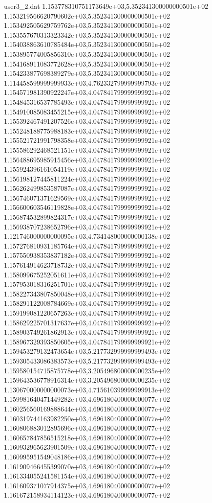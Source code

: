 \begin{filecontents}{user3_2.dat}
1.153778310751173649e+03,5.352341300000000501e+02
1.153219566620790602e+03,5.352341300000000501e+02
1.153492505629759762e+03,5.352341300000000501e+02
1.153557670313323342e+03,5.352341300000000501e+02
1.154038863610785484e+03,5.352341300000000501e+02
1.153895774005856310e+03,5.352341300000000501e+02
1.154168911083772628e+03,5.352341300000000501e+02
1.154233877698389279e+03,5.352341300000000501e+02
1.114458599999999933e+03,4.762332799999999793e+02
1.154571981390922247e+03,4.047841799999999921e+02
1.154845316537785493e+03,4.047841799999999921e+02
1.154910085083455215e+03,4.047841799999999921e+02
1.155392467491207526e+03,4.047841799999999921e+02
1.155248188775988183e+03,4.047841799999999921e+02
1.155521721991798358e+03,4.047841799999999921e+02
1.155586292468521151e+03,4.047841799999999921e+02
1.156488695985915456e+03,4.047841799999999921e+02
1.155924396161054119e+03,4.047841799999999921e+02
1.156198127445811224e+03,4.047841799999999921e+02
1.156262499853587087e+03,4.047841799999999921e+02
1.156746071371629569e+03,4.047841799999999921e+02
1.156600603546119828e+03,4.047841799999999921e+02
1.156874532899824317e+03,4.047841799999999921e+02
1.156938707238652796e+03,4.047841799999999921e+02
1.121746000000000095e+03,4.734148000000000138e+02
1.157276810931185764e+03,4.047841799999999921e+02
1.157550938353837182e+03,4.047841799999999921e+02
1.157614914623718732e+03,4.047841799999999921e+02
1.158099675252051611e+03,4.047841799999999921e+02
1.157953018316251701e+03,4.047841799999999921e+02
1.158227343807850048e+03,4.047841799999999921e+02
1.158291122008784669e+03,4.047841799999999921e+02
1.159199081220657263e+03,4.047841799999999921e+02
1.158629225701317637e+03,4.047841799999999921e+02
1.158903749261862913e+03,4.047841799999999921e+02
1.158967329393850605e+03,4.047841799999999921e+02
1.159453279132473654e+03,5.217732999999999493e+02
1.159305433086383573e+03,5.217732999999999493e+02
1.159580154715875778e+03,3.205496800000000235e+02
1.159643536778916314e+03,3.205496800000000235e+02
1.130670000000000073e+03,4.715610399999999913e+02
1.159981640471449282e+03,4.696180400000000077e+02
1.160256560169888644e+03,4.696180400000000077e+02
1.160319744163982250e+03,4.696180400000000077e+02
1.160806883012895696e+03,4.696180400000000077e+02
1.160657847856515218e+03,4.696180400000000077e+02
1.160932965623901509e+03,4.696180400000000077e+02
1.160995951549048186e+03,4.696180400000000077e+02
1.161909466455399070e+03,4.696180400000000077e+02
1.161334055241581154e+03,4.696180400000000077e+02
1.161609371077914375e+03,4.696180400000000077e+02
1.161672158934114123e+03,4.696180400000000077e+02

\end{filecontents}
